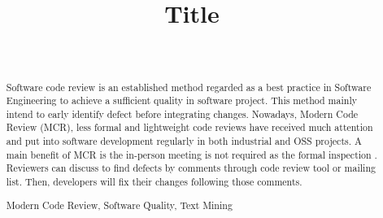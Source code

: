\documentclass[conference]{IEEEtran}
\begin{document}
\title{Title}

\author{
\\


}


\maketitle
{}
{\newcommand{\nbnote}[2]{
  \fcolorbox{blue}{yellow}{\bfseries\sffamily\scriptsize#1}
  {\sf\small\textit{#2}}
 }
}
{\newcommand{\nbnote}[2]{}
 \newcommand{\version}{}
}
\newcommand\pick[1]{\nbnote{Pick sez}{\textcolor{magenta}{#1}}}
\newcommand\thai[1]{\nbnote{Thai sez}{\textcolor{blue}{#1}}}
\newcommand\TODO[1]{\textcolor{red}{\textbf{TODO} #1}}


\begin{abstract}
Software code review is an established method regarded as a best practice in Software Engineering to achieve a sufficient quality in software project. This method mainly intend to early identify defect before integrating changes. Nowadays, Modern Code Review (MCR)\cite{Bacchelli2013a}, less formal and lightweight code reviews have received much attention and  put into software development regularly in both industrial and OSS projects. A main benefit of MCR is the in-person meeting is not required as the formal inspection \cite{Fagan:1976:DCI:1661010.1661012}. Reviewers can discuss to find defects by comments through code review tool or mailing list. Then, developers will fix their changes following those comments. 



\begin{IEEEkeywords}
Modern Code Review, Software Quality, Text Mining
\end{IEEEkeywords}
\end{abstract}
\end{document}

